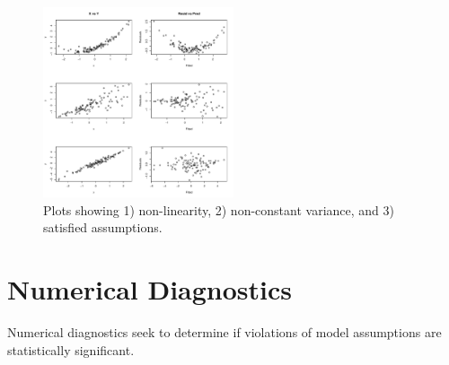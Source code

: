\documentclass[12pt]{notes}
\begin{document}
\begin{figure}[H]
\centering
\includegraphics[width = 0.5\textwidth]{figures/module2/linPlots.pdf}
\caption{Plots showing 1) non-linearity, 2) non-constant variance, and 3) satisfied assumptions.}
\end{figure}

\section{Numerical Diagnostics}
Numerical diagnostics seek to determine if violations of model assumptions are statistically significant. 


\begin{minipage}[l][3cm][c]{\textwidth}

\end{minipage}

\nspace
\end{document}
